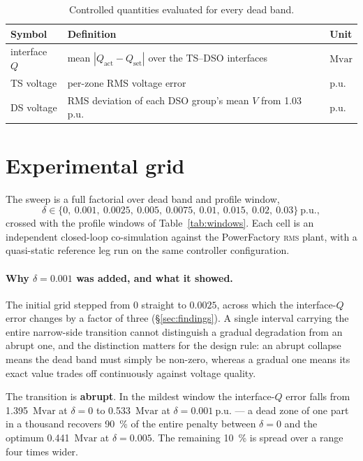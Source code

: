 \documentclass[11pt,a4paper]{article}
\newcommand{\pu}{\ensuremath{\mathrm{p.u.}}}
\newcommand{\Mvar}{\ensuremath{\mathrm{Mvar}}}
\newcommand{\rms}{\textsc{rms}}
\newcommand{\dz}{\ensuremath{\delta}}
\begin{document}
\begin{table}[htbp]
\centering
\begin{tabular}{lll}
\toprule
Symbol & Definition & Unit \\
\midrule
interface $Q$ & mean $|Q_\mathrm{act}-Q_\mathrm{set}|$ over the TS--DSO
  interfaces & \si{\Mvar} \\
TS voltage & per-zone RMS voltage error & \pu \\
DS voltage & RMS deviation of each DSO group's mean $V$ from
  \SI{1.03}{\pu} & \pu \\
\bottomrule
\end{tabular}
\caption{Controlled quantities evaluated for every dead band.}
\label{tab:metrics}
\end{table}

\section{Experimental grid}

The sweep is a full factorial over dead band and profile window,
\[
  \dz \in \{0,\ 0.001,\ 0.0025,\ 0.005,\ 0.0075,\ 0.01,\ 0.015,\ 0.02,\ 0.03\}
  \ \pu,
\]
crossed with the profile windows of Table~\ref{tab:windows}. Each cell is an
independent closed-loop co-simulation against the PowerFactory \rms{} plant,
with a quasi-static reference leg run on the same controller configuration.

\paragraph{Why $\dz = 0.001$ was added, and what it showed.} The initial grid
stepped from $0$ straight to $0.0025$, across which the interface-$Q$ error
changes by a factor of three (\S\ref{sec:findings}). A single interval carrying
the entire narrow-side transition cannot distinguish a gradual degradation from
an abrupt one, and the distinction matters for the design rule: an abrupt
collapse means the dead band must simply be non-zero, whereas a gradual one
means its exact value trades off continuously against voltage quality.

The transition is \textbf{abrupt}. In the mildest window the interface-$Q$ error
falls from \SI{1.395}{\Mvar} at $\dz=0$ to \SI{0.533}{\Mvar} at
$\dz=\SI{0.001}{\pu}$ --- a dead zone of one part in a thousand recovers
\SI{90}{\percent} of the entire penalty between $\dz=0$ and the optimum
\SI{0.441}{\Mvar} at $\dz=0.005$. The remaining \SI{10}{\percent} is spread over
a range four times wider.
\end{document}
